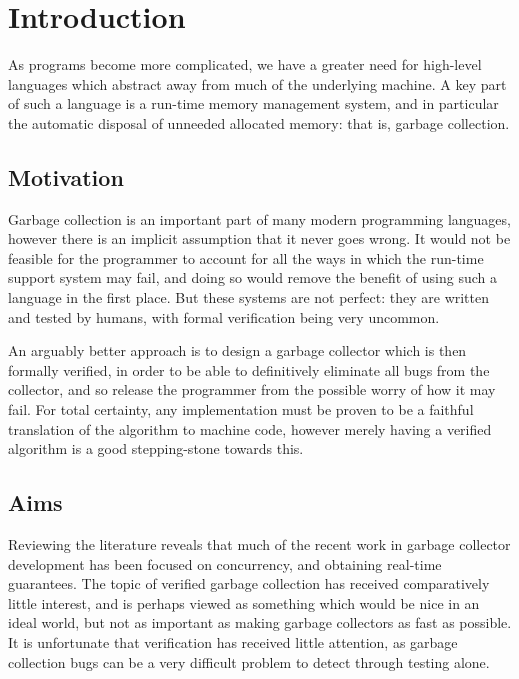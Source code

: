 \chapter{Introduction}
\label{sec:intro}

As programs become more complicated, we have a greater need for
high-level languages which abstract away from much of the underlying
machine. A key part of such a language is a run-time memory management
system, and in particular the automatic disposal of unneeded allocated
memory: that is, garbage collection.

\section{Motivation}
\label{sec:intro-motivation}

Garbage collection is an important part of many modern programming
languages, however there is an implicit assumption that it never goes
wrong. It would not be feasible for the programmer to account for all
the ways in which the run-time support system may fail, and doing so
would remove the benefit of using such a language in the first
place. But these systems are not perfect: they are written and tested
by humans, with formal verification being very uncommon.

An arguably better approach is to design a garbage collector which is
then formally verified, in order to be able to definitively eliminate
all bugs from the collector, and so release the programmer from the
possible worry of how it may fail. For total certainty, any
implementation must be proven to be a faithful translation of the
algorithm to machine code, however merely having a verified algorithm
is a good stepping-stone towards this.

\section{Aims}
\label{sec:intro-goals}

Reviewing the literature reveals that much of the recent work in
garbage collector development has been focused on concurrency, and
obtaining real-time guarantees. The topic of verified garbage
collection has received comparatively little interest, and is perhaps
viewed as something which would be nice in an ideal world, but not as
important as making garbage collectors as fast as possible. It is
unfortunate that verification has received little attention, as
garbage collection bugs can be a very difficult problem to detect
through testing alone.

